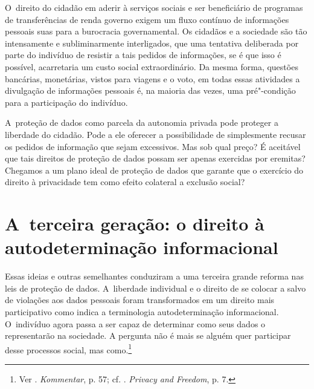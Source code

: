 O~direito do cidadão em aderir à serviços sociais e ser beneficiário de
programas de transferências de renda governo exigem um fluxo contínuo de
informações pessoais suas para a burocracia governamental. Os cidadãos e
a sociedade são tão intensamente e subliminarmente interligados, que uma
tentativa deliberada por parte do indivíduo de resistir a tais pedidos
de informações, se é que isso é possível, acarretaria um custo social
extraordinário. Da mesma forma, questões bancárias, monetárias, vistos
para viagens e o voto, em todas essas atividades a divulgação de
informações pessoais é, na maioria das vezes, uma pré"-condição para a
participação do indivíduo.

A~proteção de dados como parcela da autonomia privada pode proteger a
liberdade do cidadão. Pode a ele oferecer a possibilidade de
simplesmente recusar os pedidos de informação que sejam excessivos. Mas
sob qual preço? É aceitável que tais direitos de proteção de dados
possam ser apenas exercidas por eremitas? Chegamos a um plano ideal de
proteção de dados que garante que o exercício do direito à privacidade
tem como efeito colateral a exclusão social?

\section{A~terceira geração: o direito à autodeterminação informacional}

Essas ideias e outras semelhantes conduziram a uma terceira grande
reforma nas leis de proteção de dados. A~liberdade individual e o
direito de se colocar a salvo de violações aos dados pessoais foram
transformados em um direito mais participativo como indica a
terminologia autodeterminação informacional. O~indivíduo agora passa a
ser capaz de determinar como seus dados o representarão na sociedade. A
pergunta não é mais se alguém quer participar desse processos social,
mas como.\footnote{Ver . \emph{Kommentar}, p. 57; cf. .
  \emph{Privacy and Freedom}, p. 7.}

